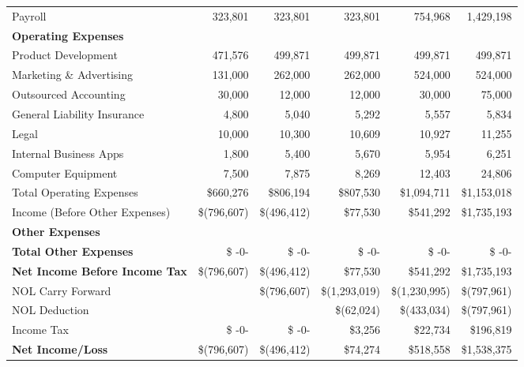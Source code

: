 \documentclass[11pt,openany]{book}
\begin{document}
\begin{landscape}
\begin{center}
\begin{longtable}[]{@{}lrrrrr@{}}
      \hspace{3mm} Payroll & 323,801 & 323,801 & 323,801 & 754,968 & 1,429,198 \\
      \textbf{Operating Expenses} & & & & & \\
      \midrule
      \hspace{3mm} Product Development & 471,576 & 499,871 & 499,871 & 499,871 & 499,871 \\
      \hspace{3mm} Marketing \& Advertising & 131,000 & 262,000 & 262,000 & 524,000 & 524,000 \\
      \hspace{3mm} Outsourced Accounting & 30,000 & 12,000 & 12,000 & 30,000 & 75,000 \\
      \hspace{3mm} General Liability Insurance & 4,800 & 5,040 & 5,292 & 5,557 & 5,834 \\
      \hspace{3mm} Legal & 10,000 & 10,300 & 10,609 & 10,927 & 11,255 \\
      \hspace{3mm} Internal Business Apps & 1,800 & 5,400 & 5,670 & 5,954 & 6,251 \\
      \hspace{3mm} Computer Equipment & 7,500 & 7,875 & 8,269 & 12,403 & 24,806 \\
      \hspace{3mm} Total Operating Expenses & \$660,276 & \$806,194 & \$807,530 & \$1,094,711 & \$1,153,018 \\
      \hspace{3mm} Income (Before Other Expenses) & \$(796,607) & \$(496,412) & \$77,530 & \$541,292 & \$1,735,193 \\
      \textbf{Other Expenses} & & & & & \\
      \midrule
      \textbf{Total Other Expenses} & \$ -0- & \$ -0- & \$ -0- & \$ -0- & \$ -0- \\
      \textbf{Net Income Before Income Tax} & \$(796,607) & \$(496,412) & \$77,530 & \$541,292 & \$1,735,193 \\
      \hspace{3mm} NOL Carry Forward & & \$(796,607) & \$(1,293,019) & \$(1,230,995) & \$(797,961) \\
      \hspace{3mm} NOL Deduction & & & \$(62,024) & \$(433,034) & \$(797,961) \\
      \hspace{3mm} Income Tax & \$ -0- & \$ -0- & \$3,256 & \$22,734 & \$196,819 \\
      \textbf{Net Income/Loss} & \$(796,607) & \$(496,412) & \$74,274 & \$518,558 & \$1,538,375 \\
      \bottomrule
    \end{longtable}
    \newpage{}


\end{center}
\end{landscape}
\end{document}
